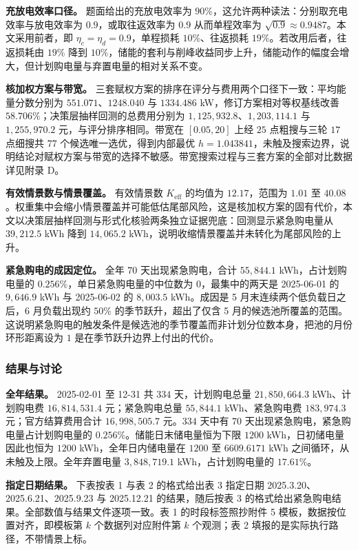 \textbf{充放电效率口径。} 题面给出的充放电效率为 $90\%$，这允许两种读法：分别取充电效率与放电效率为 $0.9$，或取往返效率为 $0.9$ 从而单程效率为 $\sqrt{0.9}\approx0.9487$。本文采用前者，即 $\eta_c=\eta_d=0.9$，单程损耗 $10\%$、往返损耗 $19\%$。若改用后者，往返损耗由 $19\%$ 降到 $10\%$，储能的套利与削峰收益同步上升，储能动作的幅度会增大，但计划购电量与弃置电量的相对关系不变。

\textbf{核加权方案与带宽。} 三套赋权方案的排序在评分与费用两个口径下一致：平均能量分数分别为 $551.071$、$1248.040$ 与 $1334.486$ kW，修订方案相对等权基线改善 $58.706\%$；决策层抽样回测的总费用分别为 $1{,}125{,}932.8$、$1{,}203{,}114.1$ 与 $1{,}255{,}970.2$ 元，与评分排序相同。带宽在 $[0.05,20]$ 上经 $25$ 点粗搜与三轮 $17$ 点细搜共 $77$ 个候选唯一选优，得到内部最优 $h=1.043841$，未触及搜索边界，说明结论对赋权方案与带宽的选择不敏感。带宽搜索过程与三套方案的全部对比数据详见附录 D。

\textbf{有效情景数与情景覆盖。} 有效情景数 $K_{\mathrm{eff}}$ 的均值为 $12.17$，范围为 $1.01$ 至 $40.08$。权重集中会缩小情景覆盖并可能低估尾部风险，这是核加权方案的固有代价，本文以决策层抽样回测与形式化核验两条独立证据兜底：回测显示紧急购电量从 $39{,}212.5$ kWh 降到 $14{,}065.2$ kWh，说明收缩情景覆盖并未转化为尾部风险的上升。

\textbf{紧急购电的成因定位。} 全年 $70$ 天出现紧急购电，合计 $55{,}844.1$ kWh，占计划购电量的 $0.256\%$，单日紧急购电量的中位数为 $0$，最集中的两天是 2025-06-01 的 $9{,}646.9$ kWh 与 2025-06-02 的 $8{,}003.5$ kWh。成因是 5 月末连续两个低负载日之后，6 月负载出现约 $50\%$ 的季节跃升，超出了仅含 5 月的候选池所覆盖的范围。这说明紧急购电的触发条件是候选池的季节覆盖而非计划分位数本身，把池的月份环形距离设为 $1$ 是在季节跃升边界上付出的代价。

\subsubsection{结果与讨论}

\textbf{全年结果。} 2025-02-01 至 12-31 共 $334$ 天，计划购电总量 $21{,}850{,}664.3$ kWh、计划购电费 $16{,}814{,}531.4$ 元；紧急购电总量 $55{,}844.1$ kWh、紧急购电费 $183{,}974.3$ 元；官方结算费用合计 $16{,}998{,}505.7$ 元。$334$ 天中有 $70$ 天出现紧急购电，紧急购电量占计划购电量的 $0.256\%$。储能日末储电量恒为下限 $1200$ kWh，日初储电量因此也恒为 $1200$ kWh，全年日内储电量在 $1200$ 至 $6609.6171$ kWh 之间循环，从未触及上限。全年弃置电量 $3{,}848{,}719.1$ kWh，占计划购电量的 $17.61\%$。

\textbf{指定日期结果。} 下表按表 1 与表 2 的格式给出表 3 指定日期 2025.3.20、2025.6.21、2025.9.23 与 2025.12.21 的结果，随后按表 3 的格式给出紧急购电结果。全部数值与结果文件逐项一致。表 1 的时段标签照抄附件 5 模板，数据按位置对齐，即模板第 $k$ 个数据列对应附件第 $k$ 个观测；表 2 填报的是实际执行路径，不带情景上标。

